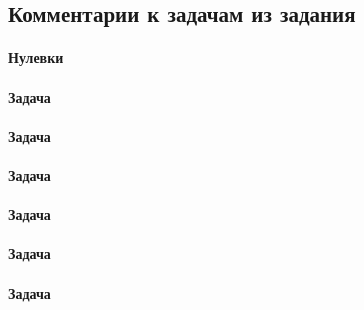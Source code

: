 \documentclass[12pt]{article}
\begin{document}
\subsection{Комментарии к задачам из задания}
\paragraph{Нулевки} 
\paragraph{Задача } 
\paragraph{Задача } 
\paragraph{Задача }
\paragraph{Задача }
\paragraph{Задача }
\paragraph{Задача }
\end{document}
